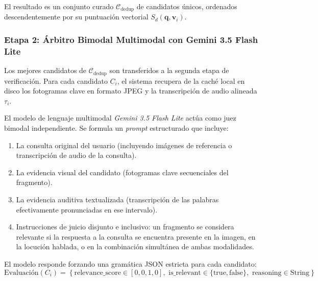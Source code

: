 El resultado es un conjunto curado $\mathcal{C}_{\text{dedup}}$ de candidatos únicos, ordenados descendentemente por su puntuación vectorial $S_d(\mathbf{q}, \mathbf{v}_i)$.

\subsubsection{Etapa 2: Árbitro Bimodal Multimodal con Gemini 3.5 Flash Lite}
Los mejores candidatos de $\mathcal{C}_{\text{dedup}}$ son transferidos a la segunda etapa de verificación. Para cada candidato $C_i$, el sistema recupera de la caché local en disco los fotogramas clave en formato JPEG y la transcripción de audio alineada $\tau_i$.

El modelo de lenguaje multimodal \textit{Gemini 3.5 Flash Lite} actúa como juez bimodal independiente. Se formula un \textit{prompt} estructurado que incluye:
\begin{enumerate}
    \item La consulta original del usuario (incluyendo imágenes de referencia o transcripción de audio de la consulta).
    \item La evidencia visual del candidato (fotogramas clave secuenciales del fragmento).
    \item La evidencia auditiva textualizada (transcripción de las palabras efectivamente pronunciadas en ese intervalo).
    \item Instrucciones de juicio disjunto e inclusivo: un fragmento se considera relevante si la respuesta a la consulta se encuentra presente en la imagen, en la locución hablada, o en la combinación simultánea de ambas modalidades.
\end{enumerate}

El modelo responde forzando una gramática JSON estricta para cada candidato:
\begin{equation}
    \text{Evaluación}(C_i) = \left\{ \text{relevance\_score} \in [0,0, 1,0], \,\, \text{is\_relevant} \in \{\text{true}, \text{false}\}, \,\, \text{reasoning} \in \text{String} \right\}
\end{equation}

